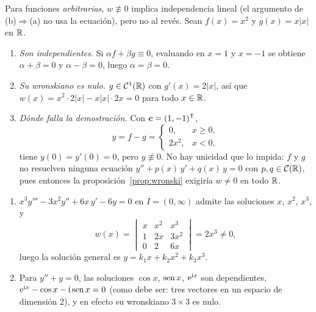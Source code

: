 \documentclass[11pt,twoside]{article}
\newcommand\Cl{\mathcal C}
\newcommand\vc{\bm c}
\newcommand\abs[1]{\lvert#1\rvert}
\begin{document}
\begin{observacion}\label{obs:reciproco}
Para funciones \emph{arbitrarias}, $w\not\equiv0$ implica independencia lineal (el argumento de (b)$\Rightarrow$(a) no
usa la ecuación), pero no al revés. Sean $f(x)=x^2$ y $g(x)=x\abs x$ en $\mathbb{R}$.
\begin{enumerate}[label=(\roman*)]
\item \emph{Son independientes.} Si $\alpha f+\beta g\equiv0$, evaluando en $x=1$ y $x=-1$ se obtiene $\alpha+\beta=0$ y
$\alpha-\beta=0$, luego $\alpha=\beta=0$.
\item \emph{Su wronskiano es nulo.} $g\in\Cl^1(\R)$ con $g'(x)=2\abs x$, así que $w(x)=x^2\cdot2\abs x-x\abs x\cdot2x=0$
para todo $x\in\mathbb{R}$.
\item \emph{Dónde falla la demostración.} Con $\vc=(1,-1)\T$,
\begin{equation*}
y=f-g=\begin{cases}0,&x\ge0,\\ 2x^2,&x<0,\end{cases}
\end{equation*}
tiene $y(0)=y'(0)=0$, pero $y\not\equiv0$. No hay unicidad que lo impida: $f$ y $g$ no resuelven ninguna ecuación
$y''+p(x)\,y'+q(x)\,y=0$ con $p,q\in\Cl(\R)$, pues entonces la proposición~\ref{prop:wronski} exigiría $w\neq0$ en todo $\mathbb{R}$.
\end{enumerate}
\end{observacion}

\begin{ejemplo}\label{ej:wronskianos}
\begin{enumerate}[label=(\roman*)]
\item $x^3y'''-3x^2y''+6x\,y'-6y=0$ en $I=(0,\infty)$ admite las soluciones $x$, $x^2$, $x^3$, y
\begin{equation*}
w(x)=\begin{vmatrix}x&x^2&x^3\\1&2x&3x^2\\0&2&6x\end{vmatrix}=2x^3\neq0,
\end{equation*}
luego la solución general es $y=k_1x+k_2x^2+k_3x^3$.
\item Para $y''+y=0$, las soluciones $\cos x$, $\operatorname{sen} x$, $\mathrm{e}^{\mathrm{i} x}$ son dependientes, $\mathrm{e}^{\mathrm{i} x}-\cos x-\mathrm{i}\operatorname{sen} x=0$
(como debe ser: tres vectores en un espacio de dimensión 2), y en efecto su wronskiano $3\times3$ es nulo.
\end{enumerate}
\end{ejemplo}
\end{document}

